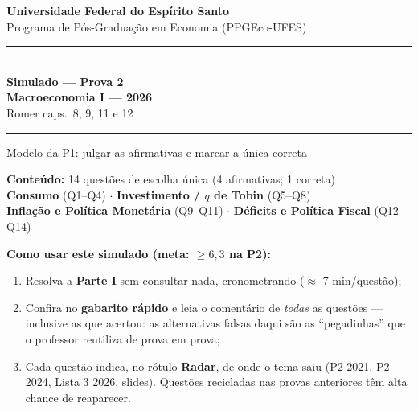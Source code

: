 \documentclass[12pt, a4paper]{article}
\begin{document}

\begin{titlepage}
\begin{center}
\vspace*{1.2cm}
{\Large\bfseries Universidade Federal do Espírito Santo}\\[0.5em]
{\large Programa de Pós-Graduação em Economia (PPGEco-UFES)}\\[2em]

\rule{\linewidth}{1.2pt}\\[0.8em]
{\LARGE\bfseries\color{cyanrbc} Simulado --- Prova 2\\[0.4em]
\large Macroeconomia I --- 2026}\\[0.4em]
{\normalsize\color{grayrbc} Romer caps.\ 8, 9, 11 e 12}\\[0.8em]
\rule{\linewidth}{1.2pt}

\vspace{1em}
{\large Modelo da P1: julgar as afirmativas e marcar a única correta}

\vspace{1.5em}
\begin{tcolorbox}[standard, colback=provabg, colframe=provaborder, width=0.9\textwidth,
  arc=4pt, boxrule=1.2pt, left=8pt, right=8pt, top=6pt, bottom=6pt]
\centering
\textbf{\textcolor{provaborder}{Conteúdo:}} 14 questões de escolha única (4 afirmativas; 1 correta)\\[0.4em]
\textbf{Consumo} (Q1--Q4) $\cdot$ \textbf{Investimento / $q$ de Tobin} (Q5--Q8)\\[0.2em]
\textbf{Inflação e Política Monetária} (Q9--Q11) $\cdot$
\textbf{Déficits e Política Fiscal} (Q12--Q14)
\end{tcolorbox}

\vspace{1.2em}
\begin{tcolorbox}[standard, colback=boxbg, colframe=boxborder, width=0.9\textwidth,
  arc=4pt, boxrule=1pt, left=8pt, right=8pt, top=6pt, bottom=6pt]
\raggedright
\textbf{Como usar este simulado (meta: $\geq 6{,}3$ na P2):}
\begin{enumerate}[leftmargin=1.5em, itemsep=0.15em, topsep=0.2em]
\item Resolva a \textbf{Parte I} sem consultar nada, cronometrando ($\approx$ 7 min/questão);
\item Confira no \textbf{gabarito rápido} e leia o comentário de \emph{todas} as
questões --- inclusive as que acertou: as alternativas falsas daqui são as
``pegadinhas'' que o professor reutiliza de prova em prova;
\item Cada questão indica, no rótulo \textbf{Radar}, de onde o tema saiu
(P2 2021, P2 2024, Lista 3 2026, slides). Questões recicladas nas provas
anteriores têm alta chance de reaparecer.
\end{enumerate}
\end{tcolorbox}


\end{center}
\end{titlepage}
\end{document}
